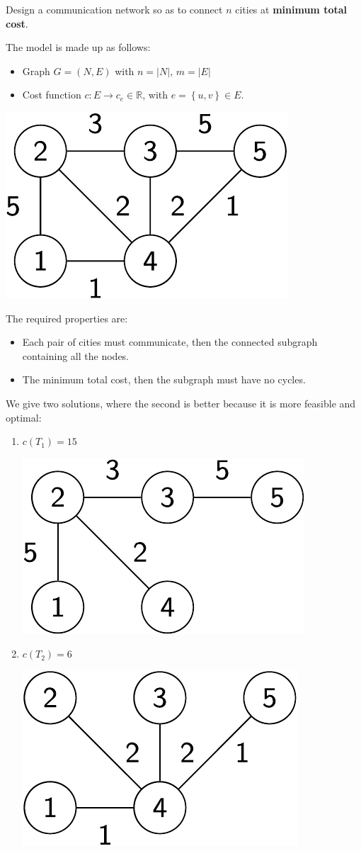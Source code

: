 \begin{examplebox}
    Design a communication network so as to connect $n$ cities at \textbf{minimum total cost}.

    The model is made up as follows:
    \begin{itemize}
        \item Graph $G = \left(N,E\right)$ with $n = \left| N \right|$, $m = \left| E \right|$
        \item Cost function $c: E \rightarrow c_{e} \in \mathbb{R}$, with $e = \left\{u,v\right\} \in E$.
    \end{itemize}
    \begin{center}
        \includegraphics[width=.3\textwidth]{img/trees-6.pdf}
    \end{center}

    The required properties are:
    \begin{itemize}
        \item Each pair of cities must communicate, then the connected subgraph containing all the nodes.
        \item The minimum total cost, then the subgraph must have no cycles.
    \end{itemize}

    We give two solutions, where the second is better because it is more feasible and optimal:
    \begin{enumerate}
        \item $c\left(T_{1}\right) = 15$
        \begin{center}
            \includegraphics[width=.3\textwidth]{img/trees-7.pdf}
        \end{center}

        \item $c\left(T_{2}\right) = 6$
        \begin{center}
            \includegraphics[width=.3\textwidth]{img/trees-8.pdf}
        \end{center}
    \end{enumerate}
\end{examplebox}

